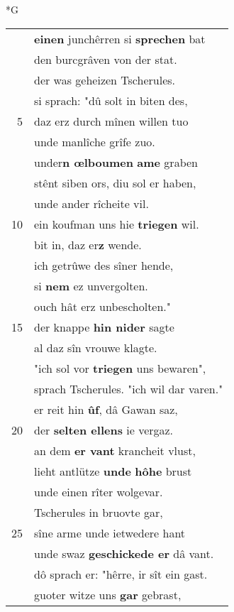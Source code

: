 \documentclass[8pt,a4paper,notitlepage]{article}
\begin{document}
\newpage
\begin{table}[ht]
\begin{minipage}[t]{0.5\linewidth}
\small
\begin{center}*G
\end{center}
\begin{tabular}{rl}
 & \textbf{einen} junchêrren si \textbf{sprechen} bat\\ 
 & den burcgrâven von der stat.\\ 
 & der was geheizen Tscherules.\\ 
 & si sprach: "dû solt in biten des,\\ 
5 & daz erz durch mînen willen tuo\\ 
 & unde manlîche grîfe zuo.\\ 
 & under\textbf{n œlboumen} \textbf{ame} graben\\ 
 & stênt siben ors, diu sol er haben,\\ 
 & unde ander rîcheite vil.\\ 
10 & ein koufman uns hie \textbf{triegen} wil.\\ 
 & bit in, daz er\textbf{z} wende.\\ 
 & ich getrûwe des sîner hende,\\ 
 & si \textbf{nem} ez unvergolten.\\ 
 & ouch hât erz unbescholten."\\ 
15 & der knappe \textbf{hin nider} sagte\\ 
 & al daz sîn vrouwe klagte.\\ 
 & "ich sol vor \textbf{triegen} uns bewaren",\\ 
 & sprach Tscherules. "ich wil dar varen."\\ 
 & er reit hin \textbf{ûf}, dâ Gawan saz,\\ 
20 & der \textbf{selten ellens} ie vergaz.\\ 
 & an dem \textbf{er vant} krancheit vlust,\\ 
 & lieht antlütze \textbf{unde} \textbf{hôhe} brust\\ 
 & unde einen rîter wolgevar.\\ 
 & Tscherules in bruovte gar,\\ 
25 & sîne arme unde ietwedere hant\\ 
 & unde swaz \textbf{geschickede er} dâ vant.\\ 
 & dô sprach er: "hêrre, ir sît ein gast.\\ 
 & guoter witze uns \textbf{gar} gebrast,\\ 

\end{tabular}
\end{minipage}
\end{table}
\end{document}
